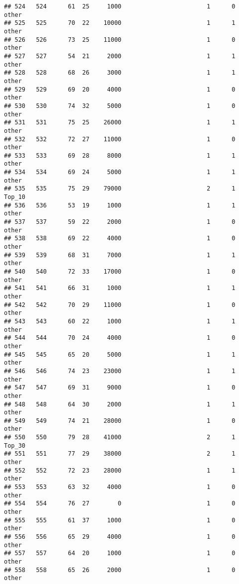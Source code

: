 \documentclass[
]{article}
\begin{document}
\begin{verbatim}
## 524   524      61  25     1000                        1      0    other
## 525   525      70  22    10000                        1      1    other
## 526   526      73  25    11000                        1      0    other
## 527   527      54  21     2000                        1      1    other
## 528   528      68  26     3000                        1      1    other
## 529   529      69  20     4000                        1      0    other
## 530   530      74  32     5000                        1      0    other
## 531   531      75  25    26000                        1      1    other
## 532   532      72  27    11000                        1      0    other
## 533   533      69  28     8000                        1      1    other
## 534   534      69  24     5000                        1      1    other
## 535   535      75  29    79000                        2      1   Top_10
## 536   536      53  19     1000                        1      1    other
## 537   537      59  22     2000                        1      0    other
## 538   538      69  22     4000                        1      0    other
## 539   539      68  31     7000                        1      1    other
## 540   540      72  33    17000                        1      0    other
## 541   541      66  31     1000                        1      1    other
## 542   542      70  29    11000                        1      0    other
## 543   543      60  22     1000                        1      1    other
## 544   544      70  24     4000                        1      0    other
## 545   545      65  20     5000                        1      1    other
## 546   546      74  23    23000                        1      1    other
## 547   547      69  31     9000                        1      0    other
## 548   548      64  30     2000                        1      1    other
## 549   549      74  21    28000                        1      0    other
## 550   550      79  28    41000                        2      1   Top_30
## 551   551      77  29    38000                        2      1    other
## 552   552      72  23    28000                        1      1    other
## 553   553      63  32     4000                        1      0    other
## 554   554      76  27        0                        1      0    other
## 555   555      61  37     1000                        1      0    other
## 556   556      65  29     4000                        1      0    other
## 557   557      64  20     1000                        1      0    other
## 558   558      65  26     2000                        1      0    other

\end{verbatim}
\end{document}
